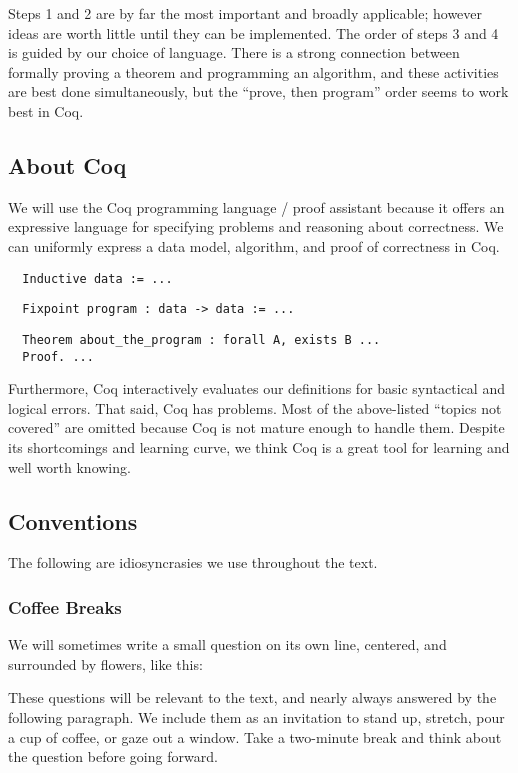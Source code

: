 \documentclass{article}
\begin{document}
Steps 1 and 2 are by far the most important and broadly applicable; however ideas are worth little until they can be implemented.
The order of steps 3 and 4 is guided by our choice of language.
There is a strong connection between formally proving a theorem and programming an algorithm, and these activities are best done simultaneously, but the ``prove, then program'' order seems to work best in Coq.

\subsection*{About Coq}
We will use the Coq programming language / proof assistant because it offers an expressive language for specifying problems and reasoning about correctness.
We can uniformly express a data model, algorithm, and proof of correctness in Coq.

\begin{center}
\begin{verbatim}
  Inductive data := ...
\end{verbatim}
\begin{verbatim}
  Fixpoint program : data -> data := ...
\end{verbatim}
\begin{verbatim}
  Theorem about_the_program : forall A, exists B ... 
  Proof. ...
\end{verbatim}
\end{center}

Furthermore, Coq interactively evaluates our definitions for basic syntactical and logical errors.
That said, Coq has problems.
Most of the above-listed ``topics not covered'' are omitted because Coq is not mature enough to handle them.
Despite its shortcomings and learning curve, we think Coq is a great tool for learning and well worth knowing.

\subsection*{Conventions}

The following are idiosyncrasies we use throughout the text.

\subsubsection*{Coffee Breaks}

We will sometimes write a small question on its own line, centered, and surrounded by flowers, like this:


These questions will be relevant to the text, and nearly always answered by the following paragraph.
We include them as an invitation to stand up, stretch, pour a cup of coffee, or gaze out a window.
Take a two-minute break and think about the question before going forward.
\end{document}

